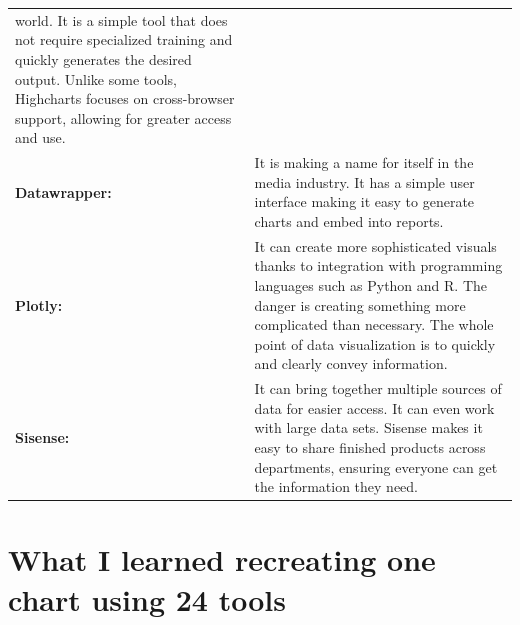 \documentclass[]{book}
\theoremstyle{definition}
\theoremstyle{definition}
\theoremstyle{definition}
\theoremstyle{remark}
\begin{document}
\begin{longtable}[]{@{}ll@{}}
\begin{minipage}[t]{0.78\columnwidth}
world. It is a simple tool that does not require specialized training
and quickly generates the desired output. Unlike some tools, Highcharts
focuses on cross-browser support, allowing for greater access and
use.\strut
\end{minipage}\tabularnewline
\begin{minipage}[t]{0.16\columnwidth}\raggedright\strut
\textbf{Datawrapper:}\strut
\end{minipage} & \begin{minipage}[t]{0.78\columnwidth}\raggedright\strut
It is making a name for itself in the media industry. It has a simple
user interface making it easy to generate charts and embed into
reports.\strut
\end{minipage}\tabularnewline
\begin{minipage}[t]{0.16\columnwidth}\raggedright\strut
\textbf{Plotly:}\strut
\end{minipage} & \begin{minipage}[t]{0.78\columnwidth}\raggedright\strut
It can create more sophisticated visuals thanks to integration with
programming languages such as Python and R. The danger is creating
something more complicated than necessary. The whole point of data
visualization is to quickly and clearly convey information.\strut
\end{minipage}\tabularnewline
\begin{minipage}[t]{0.16\columnwidth}\raggedright\strut
\textbf{Sisense:}\strut
\end{minipage} & \begin{minipage}[t]{0.78\columnwidth}\raggedright\strut
It can bring together multiple sources of data for easier access. It can
even work with large data sets. Sisense makes it easy to share finished
products across departments, ensuring everyone can get the information
they need.\strut
\end{minipage}\tabularnewline
\bottomrule
\end{longtable}

\section{What I learned recreating one chart using 24
tools}\label{what-i-learned-recreating-one-chart-using-24-tools}
\end{document}
